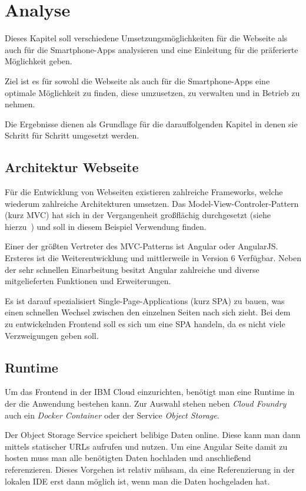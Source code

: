 \section{Analyse}
Dieses Kapitel soll verschiedene Umsetzungsmöglichkeiten für die Webseite als auch für die Smartphone-Apps analysieren
und eine Einleitung für die präferierte Möglichkeit geben.

Ziel ist es für sowohl die Webseite als auch für die Smartphone-Apps eine optimale Möglichkeit zu finden, diese
umzusetzen, zu verwalten und in Betrieb zu nehmen.

Die Ergebnisse dienen als Grundlage für die darauffolgenden Kapitel in denen sie Schritt für Schritt umgesetzt werden.

\subsection{Architektur Webseite}
Für die Entwicklung von Webseiten existieren zahlreiche Frameworks, welche wiederum zahlreiche Architekturen umsetzen.
Das Model-View-Controler-Pattern (kurz MVC) hat sich in der Vergangenheit großflächig durchgesetzt (siehe
hierzu~\cite{book_grundlagen_mvc}) und soll in diesem Beispiel Verwendung finden.

Einer der größten Vertreter des MVC-Patterns ist Angular oder AngularJS. Ersteres ist die Weiterentwicklung und
mittlerweile in Version 6 Verfügbar. Neben der sehr schnellen Einarbeitung besitzt Angular zahlreiche und diverse
mitgelieferten Funktionen und Erweiterungen.

Es ist darauf spezialisiert Single-Page-Applications (kurz SPA) zu bauen, was einen schnellen Wechsel zwischen den
einzelnen Seiten nach sich zieht. Bei dem zu entwickelnden Frontend soll es sich um eine SPA handeln, da es nicht viele
Verzweigungen geben soll.

\subsection{Runtime}
Um das Frontend in der IBM Cloud einzurichten, benötigt man eine Runtime in der die Anwendung bestehen kann. Zur
Auswahl stehen neben \textit{Cloud Foundry} auch ein \textit{Docker Container} oder der Service \textit{Object Storage}.

Der Object Storage Service speichert belibige Daten online. Diese kann man dann mittels statischer URLs aufrufen und
nutzen. Um eine Angular Seite damit zu hosten muss man alle benötigten Daten hochladen und anschließend referenzieren.
Dieses Vorgehen ist relativ mühsam, da eine Referenzierung in der lokalen IDE erst dann möglich ist, wenn man die Daten
hochgeladen hat.

